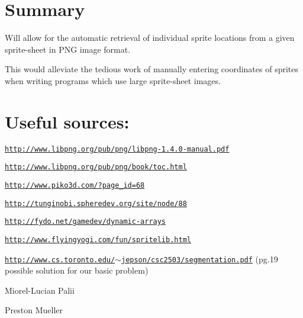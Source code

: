 \hypertarget{index_sum_sec}{}\section{Summary}\label{index_sum_sec}
Will allow for the automatic retrieval of individual sprite locations from a given sprite-\/sheet in PNG image format. \par
 This would alleviate the tedious work of manually entering coordinates of sprites when writing programs which use large sprite-\/sheet images.\hypertarget{index_srcs}{}\section{Useful sources:}\label{index_srcs}

\begin{DoxyItemize}
\item \href{http://www.libpng.org/pub/png/libpng-1.4.0-manual.pdf}{\tt http://www.libpng.org/pub/png/libpng-\/1.4.0-\/manual.pdf}  
\item \href{http://www.libpng.org/pub/png/book/toc.html}{\tt http://www.libpng.org/pub/png/book/toc.html}  
\item \href{http://www.piko3d.com/?page_id=68}{\tt http://www.piko3d.com/?page\_\-id=68}  
\item \href{http://tunginobi.spheredev.org/site/node/88}{\tt http://tunginobi.spheredev.org/site/node/88}  
\item \href{http://fydo.net/gamedev/dynamic-arrays}{\tt http://fydo.net/gamedev/dynamic-\/arrays}  
\item \href{http://www.flyingyogi.com/fun/spritelib.html}{\tt http://www.flyingyogi.com/fun/spritelib.html}  
\item \href{http://www.cs.toronto.edu/~jepson/csc2503/segmentation.pdf}{\tt http://www.cs.toronto.edu/$\sim$jepson/csc2503/segmentation.pdf} (pg.19 possible solution for our basic problem)  
\item Miorel-\/Lucian Palii  
\item Preston Mueller  
\end{DoxyItemize}